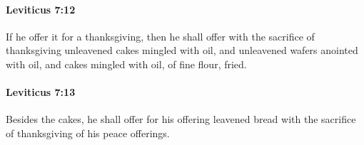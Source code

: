 		\paragraph{Leviticus 7:12} %
			\label{LEVITICUS-7-12}

			If he offer it for a thanksgiving, then he shall offer with the sacrifice of thanksgiving unleavened cakes mingled with oil, and unleavened wafers anointed with oil, and cakes mingled with oil, of fine flour, fried.


		\paragraph{Leviticus 7:13} %
			\label{LEVITICUS-7-13}

			Besides the cakes, he shall offer for his offering leavened bread with the sacrifice of thanksgiving of his peace offerings.


